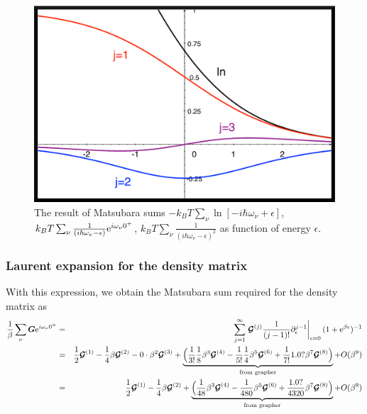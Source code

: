 \documentclass[11pt,a4paper]{report}
\begin{document}
\begin{figure}[h!]
\begin{center}
\includegraphics[width=0.5\linewidth,clip=true]
{Figs/Matsubarasums/matsubarasums1.eps}
\end{center}
\caption{\label{fig:matsubarasums} The result of Matsubara sums
  $-k_BT\sum_\nu\ln[-i\hbar\omega_\nu+\epsilon]$, $k_BT\sum_\nu
  \frac{1}{(i\hbar\omega_\nu-\epsilon)}\mathrm{e}^{i\omega_\nu 0^+}$,
$k_BT\sum_\nu \frac{1}{(i\hbar\omega_\nu-\epsilon)^2}$ as
  function of energy $\epsilon$.}
\end{figure}

\subsubsection{Laurent expansion for the density matrix}
With this expression, we obtain the Matsubara sum required for the
density matrix as
\begin{eqnarray*}
\frac{1}{\beta}\sum_\nu\bm{G}\mathrm{e}^{i\omega_\nu0^+}
&=&\sum_{j=1}^\infty
\left.\bm{\mathcal{G}}^{(j)}\frac{1}{(j-1)!}
\partial^{j-1}_\epsilon\right|_{\epsilon=0}(1+\mathrm{e}^{\beta\epsilon})^{-1}
\nonumber\\
&=&
\frac{1}{2}\bm{\mathcal{G}}^{(1)}
-\frac{1}{4}\beta\bm{\mathcal{G}}^{(2)}
-0\cdot\beta^2\bm{\mathcal{G}}^{(3)}
+\underbrace{\Bigl(
\frac{1}{3!}\frac{1}{8}\beta^3\bm{\mathcal{G}}^{(4)}
-\frac{1}{5!}\frac{1}{4}\beta^5\bm{\mathcal{G}}^{(6)}
+\frac{1}{7!}1.0?\beta^7\bm{\mathcal{G}}^{(8)}\Bigr)
}_{\text{from grapher}}
+O(\beta^9)
\nonumber\\
&=&
\frac{1}{2}\bm{\mathcal{G}}^{(1)}
-\frac{1}{4}\beta\bm{\mathcal{G}}^{(2)}
+\underbrace{\Bigl(
\frac{1}{48}\beta^3\bm{\mathcal{G}}^{(4)}
-\frac{1}{480}\beta^5\bm{\mathcal{G}}^{(6)}
+\frac{1.0?}{4320}\beta^7\bm{\mathcal{G}}^{(8)}\Bigr)}_{\text{from grapher}}
+O(\beta^9)
\end{eqnarray*}

\clearpage


\end{document}
